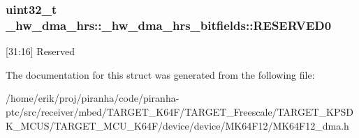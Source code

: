 \subsubsection[{\texorpdfstring{R\+E\+S\+E\+R\+V\+E\+D0}{RESERVED0}}]{\setlength{\rightskip}{0pt plus 5cm}uint32\+\_\+t \+\_\+hw\+\_\+dma\+\_\+hrs\+::\+\_\+hw\+\_\+dma\+\_\+hrs\+\_\+bitfields\+::\+R\+E\+S\+E\+R\+V\+E\+D0}\hypertarget{struct__hw__dma__hrs_1_1__hw__dma__hrs__bitfields_a33baa3314823ac91cf32dc8e5a6a8b90}{}\label{struct__hw__dma__hrs_1_1__hw__dma__hrs__bitfields_a33baa3314823ac91cf32dc8e5a6a8b90}
\mbox{[}31\+:16\mbox{]} Reserved 

The documentation for this struct was generated from the following file\+:\begin{DoxyCompactItemize}
\item 
/home/erik/proj/piranha/code/piranha-\/ptc/src/receiver/mbed/\+T\+A\+R\+G\+E\+T\+\_\+\+K64\+F/\+T\+A\+R\+G\+E\+T\+\_\+\+Freescale/\+T\+A\+R\+G\+E\+T\+\_\+\+K\+P\+S\+D\+K\+\_\+\+M\+C\+U\+S/\+T\+A\+R\+G\+E\+T\+\_\+\+M\+C\+U\+\_\+\+K64\+F/device/device/\+M\+K64\+F12/M\+K64\+F12\+\_\+dma.\+h\end{DoxyCompactItemize}
